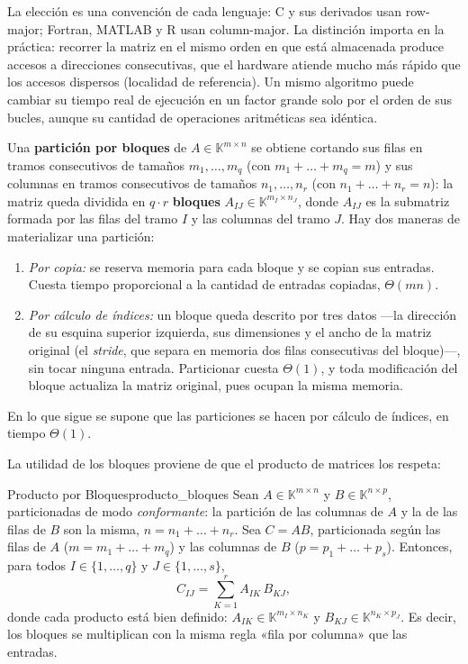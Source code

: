 \documentclass[11pt, a4paper]{article}
\begin{document}
\obs La elección es una convención de cada lenguaje: C y sus derivados usan row-major; Fortran, MATLAB y R usan column-major. La distinción importa en la práctica: recorrer la matriz en el mismo orden en que está almacenada produce accesos a direcciones consecutivas, que el hardware atiende mucho más rápido que los accesos dispersos (localidad de referencia). Un mismo algoritmo puede cambiar su tiempo real de ejecución en un factor grande solo por el orden de sus bucles, aunque su cantidad de operaciones aritméticas sea idéntica.

Una \textbf{partición por bloques} de $A \in \mathbb{K}^{m \times n}$ se obtiene cortando sus filas en tramos consecutivos de tamaños $m_1, \dots, m_q$ (con $m_1 + \dots + m_q = m$) y sus columnas en tramos consecutivos de tamaños $n_1, \dots, n_r$ (con $n_1 + \dots + n_r = n$): la matriz queda dividida en $q \cdot r$ \textbf{bloques} $A_{IJ} \in \mathbb{K}^{m_I \times n_J}$, donde $A_{IJ}$ es la submatriz formada por las filas del tramo $I$ y las columnas del tramo $J$. Hay dos maneras de materializar una partición:
\begin{enumerate}
    \item \textit{Por copia:} se reserva memoria para cada bloque y se copian sus entradas. Cuesta tiempo proporcional a la cantidad de entradas copiadas, $\Theta(mn)$.
    \item \textit{Por cálculo de índices:} un bloque queda descrito por tres datos —la dirección de su esquina superior izquierda, sus dimensiones y el ancho de la matriz original (el \emph{stride}, que separa en memoria dos filas consecutivas del bloque)—, sin tocar ninguna entrada. Particionar cuesta $\Theta(1)$, y toda modificación del bloque actualiza la matriz original, pues ocupan la misma memoria.
\end{enumerate}
En lo que sigue se supone que las particiones se hacen por cálculo de índices, en tiempo $\Theta(1)$.

La utilidad de los bloques proviene de que el producto de matrices los respeta:

\begin{proposicion}{Producto por Bloques}{producto_bloques}
Sean $A \in \mathbb{K}^{m \times n}$ y $B \in \mathbb{K}^{n \times p}$, particionadas de modo \emph{conformante}: la partición de las columnas de $A$ y la de las filas de $B$ son la misma, $n = n_1 + \dots + n_r$. Sea $C = AB$, particionada según las filas de $A$ ($m = m_1 + \dots + m_q$) y las columnas de $B$ ($p = p_1 + \dots + p_s$). Entonces, para todos $I \in \{1, \dots, q\}$ y $J \in \{1, \dots, s\}$,
\[
C_{IJ} = \sum_{K=1}^{r} A_{IK} \, B_{KJ},
\]
donde cada producto está bien definido: $A_{IK} \in \mathbb{K}^{m_I \times n_K}$ y $B_{KJ} \in \mathbb{K}^{n_K \times p_J}$. Es decir, los bloques se multiplican con la misma regla «fila por columna» que las entradas.
\end{proposicion}
\end{document}
